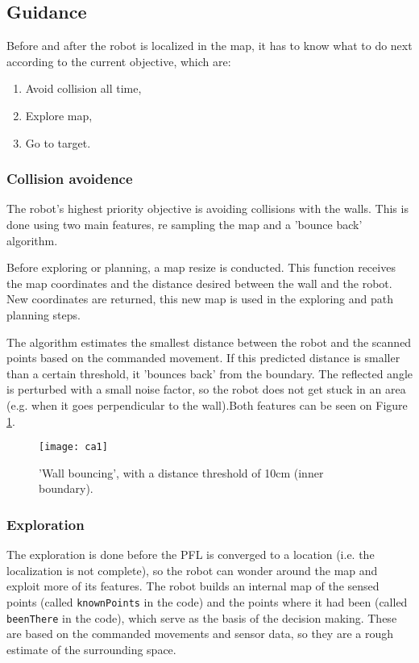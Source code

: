 \subsection{Guidance}

	Before and after the robot is localized in the map, it has to know what to do next according to the current objective, which are:
	\begin{enumerate}
		\item Avoid collision all time,
		\item Explore map,
		\item Go to target.
	\end{enumerate}
	
	\subsubsection{Collision avoidence}
	
		The robot's highest priority objective is avoiding collisions with the walls. This is done using two main features, re sampling the map and a 'bounce back' algorithm.
		
		Before exploring or planning, a map resize is conducted. This function receives the map coordinates and the distance desired between the wall and the robot. New coordinates are returned, this new map is used in the exploring and path planning steps.
		 
		The algorithm estimates the smallest distance between the robot and the scanned points based on the commanded movement. If this predicted distance is smaller than a certain threshold, it 'bounces back' from the boundary. The reflected angle is perturbed with a small noise factor, so the robot does not get stuck in an area (e.g. when it goes perpendicular to the wall).Both features can be seen on Figure \ref{fig:ca}.
		
		\begin{figure}[h]
		   \centering
			\texttt{[image: ca1]}
		    
		   \caption{'Wall bouncing', with a distance threshold of 10cm (inner boundary).}
		   \label{fig:ca}
	 	\end{figure}
	
	\subsubsection{Exploration}
	
		The exploration is done before the PFL is converged to a location (i.e. the localization is not complete), so the robot can wonder around the map and exploit more of its features. The robot builds an internal map of the sensed points (called {\tt knownPoints} in the code) and the points where it had been (called {\tt beenThere} in the code), which serve as the basis of the decision making. These are based on the commanded movements and sensor data, so they are a rough estimate of the surrounding space. 
		

